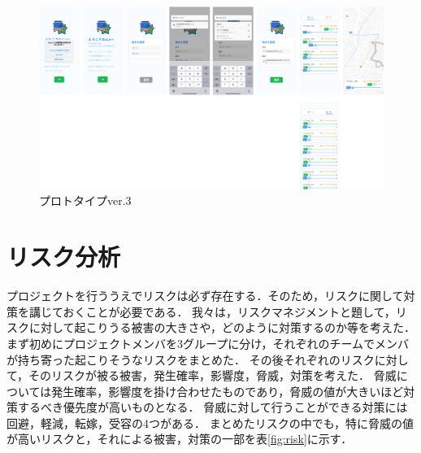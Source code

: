 \begin{figure}[H]
    \centering
    \includegraphics[width=14cm]{images/prototype_v3.png}
    \caption{プロトタイプver.3}
    \label{fig:prototype_v3}
\end{figure}

\section{リスク分析}
プロジェクトを行ううえでリスクは必ず存在する．そのため，リスクに関して対策を講じておくことが必要である．
我々は，リスクマネジメント\cite{risk}と題して，リスクに対して起こりうる被害の大きさや，どのように対策するのか等を考えた．
まず初めにプロジェクトメンバを3グループに分け，それぞれのチームでメンバが持ち寄った起こりそうなリスクをまとめた．
その後それぞれのリスクに対して，そのリスクが被る被害，発生確率，影響度，脅威，対策を考えた．
脅威については発生確率，影響度を掛け合わせたものであり，脅威の値が大きいほど対策するべき優先度が高いものとなる．
脅威に対して行うことができる対策には回避，軽減，転嫁，受容の4つがある．
まとめたリスクの中でも，特に脅威の値が高いリスクと，それによる被害，対策の一部を表\ref{fig:risk}に示す．

